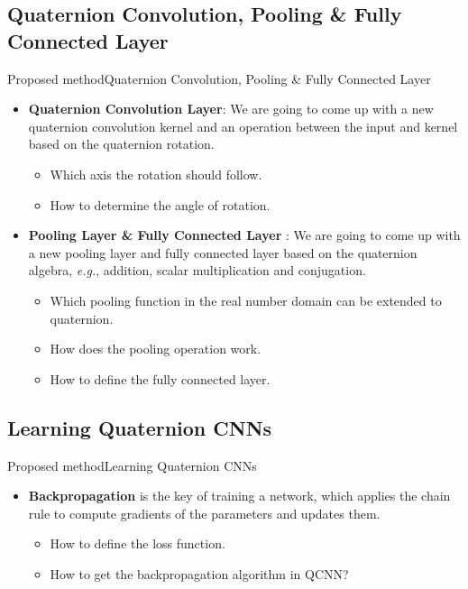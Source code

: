 \documentclass{beamer}
\begin{document}
\subsection{Quaternion Convolution, Pooling \& Fully Connected Layer}
\begin{frame}{Proposed method}{Quaternion Convolution, Pooling \& Fully Connected Layer}
    \begin{itemize}
        \item \textbf{Quaternion Convolution Layer}: We are going to come up with a new quaternion convolution kernel and an operation between the input and kernel based on the quaternion rotation.\begin{itemize}
            \item Which axis the rotation should follow.
            \item How to determine the angle of rotation.
        \end{itemize}
        \item \textbf{Pooling Layer \& Fully Connected Layer }: We are going to come up with a new pooling layer and fully connected layer based on the quaternion algebra, \emph{e.g.}, addition, scalar multiplication and conjugation.
            \begin{itemize}
                \item Which pooling function in the real number domain can be extended to quaternion.
                \item How does the pooling operation work.
                \item How to define the fully connected layer.
            \end{itemize}
    \end{itemize}
\end{frame}
\subsection{Learning Quaternion CNNs}
\begin{frame}{Proposed method}{Learning Quaternion CNNs}
    \begin{itemize}
        \item \textbf{Backpropagation} is the key of training a network, which applies the chain rule to compute gradients of the parameters and updates them.
        \begin{itemize}
            \item How to define the loss function.
            \item How to get the backpropagation algorithm in QCNN?
        \end{itemize}
    \end{itemize}
\end{frame}
\end{document}
